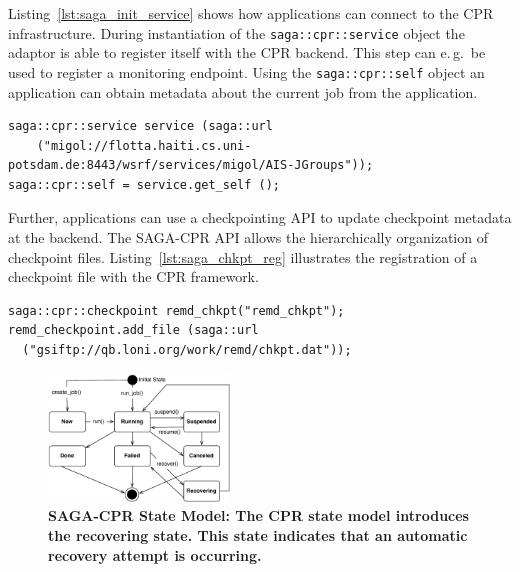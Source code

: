 \documentclass[conference,final]{IEEEtran}
\newcommand{\up}{\vspace*{-1em}}
\begin{document}
Listing~\ref{lst:saga_init_service} shows how applications can connect
to the CPR infrastructure. During instantiation of the
\texttt{saga::cpr::service} object the adaptor is able to register
itself with the CPR backend. This step can e.\,g.\ be used to register
a monitoring endpoint. Using the \texttt{saga::cpr::self} object an
application can obtain metadata about the current job from the
application.
\begin{lstlisting}[style=myListing, caption={\small \bf SAGA-CPR: Initialize Migol Session}, float=t, label={lst:saga_init_service}]
saga::cpr::service service (saga::url 
    ("migol://flotta.haiti.cs.uni-potsdam.de:8443/wsrf/services/migol/AIS-JGroups"));
saga::cpr::self = service.get_self ();
\end{lstlisting}

Further, applications can use a checkpointing API to update checkpoint metadata at the backend. The SAGA-CPR API allows the hierarchically 
organization of checkpoint files. 
Listing~\ref{lst:saga_chkpt_reg} illustrates 
the registration of a checkpoint file with the CPR framework.     
\begin{lstlisting}[style=myListing, caption={\small \bf SAGA-CPR: Checkpoint Registration}, float=t, label={lst:saga_chkpt_reg}]
saga::cpr::checkpoint remd_chkpt("remd_chkpt");
remd_checkpoint.add_file (saga::url 
  ("gsiftp://qb.loni.org/work/remd/chkpt.dat"));
\end{lstlisting}

\begin{figure}[h!]
    \centering
        \includegraphics[width=0.43\textwidth]{cpr-statemodel.pdf}
    \caption{\small \bf SAGA-CPR State Model: The CPR state model introduces the recovering state. This state indicates that an automatic recovery attempt is  occurring.\up\up}
    \label{fig:cpr-statemodel}
\end{figure}
 
\end{document}
